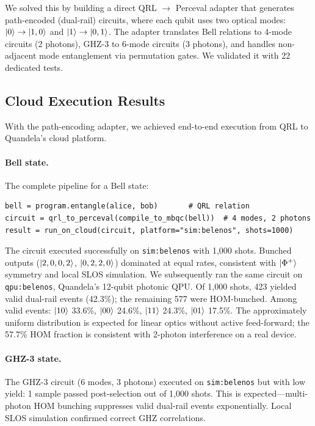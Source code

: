 \documentclass[submission,copyright,creativecommons]{eptcs}
\newcommand{\qrl}{\textsc{QRL}}
\begin{document}
We solved this by building a direct \qrl{} $\rightarrow$ Perceval adapter
that generates path-encoded (dual-rail) circuits, where each qubit uses
two optical modes: $\ket{0} \rightarrow \ket{1,0}$ and
$\ket{1} \rightarrow \ket{0,1}$. The adapter translates Bell relations
to 4-mode circuits (2 photons), GHZ-3 to 6-mode circuits (3 photons),
and handles non-adjacent mode entanglement via permutation gates.
We validated it with 22 dedicated tests.

\subsection{Cloud Execution Results}

With the path-encoding adapter, we achieved end-to-end execution from
\qrl{} to Quandela's cloud platform.

\paragraph{Bell state.}
The complete pipeline for a Bell state:

\begin{lstlisting}
bell = program.entangle(alice, bob)       # QRL relation
circuit = qrl_to_perceval(compile_to_mbqc(bell))  # 4 modes, 2 photons
result = run_on_cloud(circuit, platform="sim:belenos", shots=1000)
\end{lstlisting}

The circuit executed successfully on \texttt{sim:belenos} with 1{,}000
shots. Bunched outputs ($\ket{2,0,0,2}$, $\ket{0,2,2,0}$) dominated at
equal rates, consistent with $\ket{\Phi^+}$ symmetry and local SLOS
simulation. We subsequently ran the same circuit on \texttt{qpu:belenos},
Quandela's 12-qubit photonic QPU. Of 1{,}000 shots, 423 yielded valid
dual-rail events (42.3\%); the remaining 577 were HOM-bunched. Among
valid events: $\ket{10}$ 33.6\%, $\ket{00}$ 24.6\%, $\ket{11}$ 24.3\%,
$\ket{01}$ 17.5\%. The approximately uniform distribution is expected for
linear optics without active feed-forward; the 57.7\% HOM fraction
is consistent with 2-photon interference on a real device.

\paragraph{GHZ-3 state.}
The GHZ-3 circuit (6 modes, 3 photons) executed on \texttt{sim:belenos}
but with low yield: 1 sample passed post-selection out of 1{,}000 shots.
This is expected---multi-photon HOM bunching suppresses valid dual-rail
events exponentially. Local SLOS simulation confirmed correct GHZ
correlations.
\end{document}
